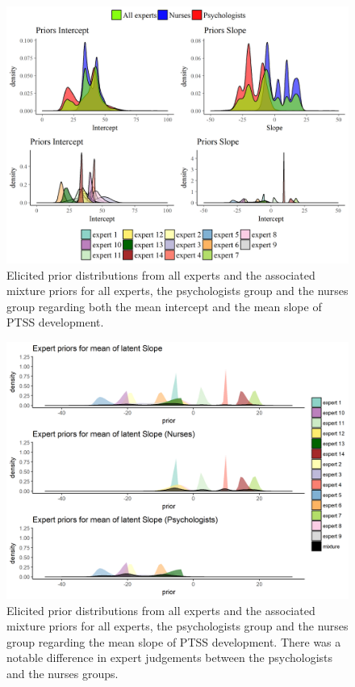 \documentclass[openright,titlepage,12pt,a4paper]{book}
\begin{document}
\begin{figure}[H]

{\centering \includegraphics[width=1\linewidth]{figures/chapter_6/all_priors} 

}

\caption{Elicited prior distributions from all experts and the associated mixture priors for all experts, the psychologists group and the nurses group regarding both the mean intercept and the mean slope of PTSS development.}\label{fig:ch06fig6}
\end{figure}

\begin{figure}[H]

{\centering \includegraphics[width=0.85\linewidth]{figures/chapter_6/priors_experts_slope} 

}

\caption{Elicited prior distributions from all experts and the associated mixture priors for all experts, the psychologists group and the nurses group regarding the mean slope of PTSS development. There was a notable difference in expert judgements between the psychologists and the nurses groups.}\label{fig:ch06fig7}
\end{figure}
\end{document}
